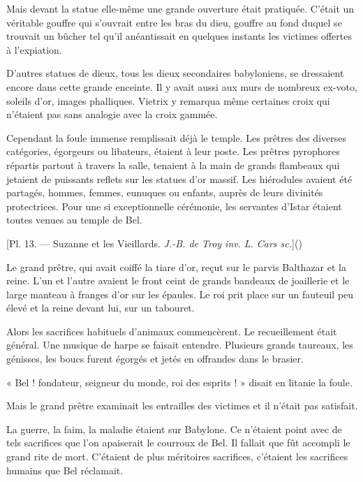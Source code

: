 \documentclass[a4paper, 11pt, oneside, polutonikogreek, french]{article}
\begin{document}
Mais devant la statue elle-même une grande ouverture était pratiquée. C'était un véritable gouffre qui s'ouvrait entre les bras du dieu, gouffre au fond duquel se trouvait un bûcher tel qu'il anéantissait en quelques instants les victimes offertes à l'expiation.

D'autres statues de dieux, tous les dieux secondaires babyloniens, se dressaient encore dans cette grande enceinte. Il y avait aussi aux murs de nombreux ex-voto, soleils d'or, images phalliques. Vietrix y remarqua même certaines croix qui n'étaient pas sans analogie avec la croix gammée.

\bigskip
\centerline{\EightStarTaper}
\centerline{\EightStarTaper\EightStarTaper}
\bigskip

Cependant la foule immense remplissait déjà le temple. Les prêtres des diverses catégories, égorgeurs ou libateurs, étaient à leur poste. Les prêtres pyrophores répartis partout à travers la salle, tenaient à la main de grands flambeaux qui jetaient de puissants reflets sur les statues d'or massif. Les hiérodules avaient été partagés, hommes, femmes, eunuques ou enfants, auprès de leurs divinités protectrices. Pour une si exceptionnelle cérémonie, les servantes d'Istar étaient toutes venues au temple de Bel.

[Pl. 13. --- Suzanne et les Vieillards. \emph{J.-B. de Troy inv.} \emph{L. Cars sc.}]()

Le grand prêtre, qui avait coiffé la tiare d'or, reçut sur le parvis Balthazar et la reine. L'un et l'autre avaient le front ceint de grands bandeaux de joaillerie et le large manteau à franges d'or sur les épaules. Le roi prit place sur un fauteuil peu élevé et la reine devant lui, sur un tabouret.

\bigskip
\centerline{\EightStarTaper}
\centerline{\EightStarTaper\EightStarTaper}
\bigskip

Alors les sacrifices habituels d'animaux commencèrent. Le recueillement était général. Une musique de harpe se faisait entendre. Plusieurs grands taureaux, les génisses, les boucs furent égorgés et jetés en offrandes dans le brasier.

« Bel ! fondateur, seigneur du monde, roi des esprits ! » disait en litanie la foule.

Mais le grand prêtre examinait les entrailles des victimes et il n'était pas satisfait.

La guerre, la faim, la maladie étaient sur Babylone. Ce n'étaient point avec de tels sacrifices que l'on apaiserait le courroux de Bel. Il fallait que fût accompli le grand rite de mort. C'étaient de plus méritoires sacrifices, c'étaient les sacrifices humains que Bel réclamait.
\end{document}
